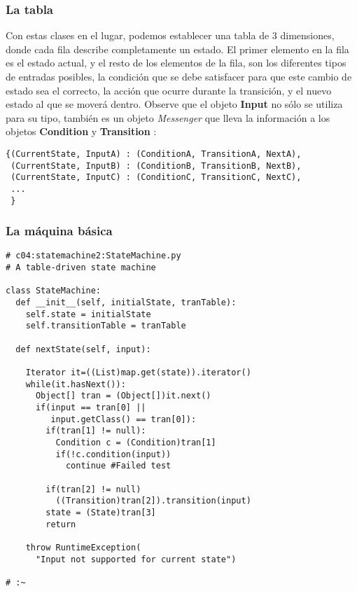 \subsubsection*{La tabla}
\label{subsubsec:lt}

Con estas clases en el lugar, podemos establecer una tabla de 3 dimensiones, donde cada fila describe completamente un estado. El primer elemento en la fila es el estado actual, y el resto de los elementos de la fila, son los diferentes tipos de entradas posibles, la condición que se debe satisfacer para que este cambio de estado sea el correcto, la acción que ocurre durante la transición, y el nuevo estado al que se moverá dentro. Observe que el objeto \textbf{Input} no sólo se utiliza para su tipo, también es un objeto \textit{Messenger} que lleva la información a los objetos \textbf{Condition} y \textbf{ Transition} :     \newline

\begin{lstlisting}
{(CurrentState, InputA) : (ConditionA, TransitionA, NextA), 
 (CurrentState, InputB) : (ConditionB, TransitionB, NextB), 
 (CurrentState, InputC) : (ConditionC, TransitionC, NextC), 
 ... 
 }
\end{lstlisting}


\subsubsection*{La máquina básica}
\label{subsubsec:lmb}

\begin{lstlisting}
# c04:statemachine2:StateMachine.py 
# A table-driven state machine 

class StateMachine: 
  def __init__(self, initialState, tranTable): 
    self.state = initialState 
    self.transitionTable = tranTable 
    
  def nextState(self, input): 
  
    Iterator it=((List)map.get(state)).iterator() 
    while(it.hasNext()): 
      Object[] tran = (Object[])it.next() 
      if(input == tran[0] ||  
         input.getClass() == tran[0]): 
        if(tran[1] != null): 
          Condition c = (Condition)tran[1] 
          if(!c.condition(input)) 
            continue #Failed test
            
        if(tran[2] != null) 
          ((Transition)tran[2]).transition(input) 
        state = (State)tran[3] 
        return 
        
    throw RuntimeException( 
      "Input not supported for current state") 
      
# :~ 
\end{lstlisting}

